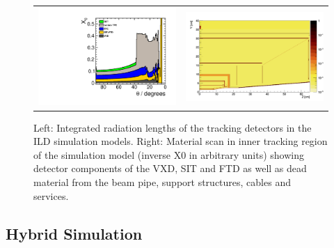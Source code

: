 \begin{figure}[b!]
\begin{tabular}{cc}
\includegraphics[width=0.4\hsize]{Modelling/fig/ILD_l5_v02_matbudget_tracker_85deg.pdf} &
\includegraphics[width=0.6\hsize]{Modelling/fig/ILD_large_inner_tracker_x0_scan.png}
\end{tabular}
\caption{\label{fig:sim_large_small}Left: Integrated radiation lengths of the tracking detectors in the ILD simulation models.
  Right: Material scan in inner tracking region of the simulation model (inverse X0 in arbitrary units) showing detector components of the VXD, SIT and FTD as well
  as dead material from the beam pipe, support structures, cables and services.}
\end{figure}


\subsection{Hybrid Simulation}

